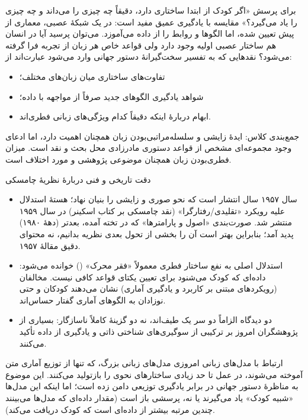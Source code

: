برای پرسش «اگر کودک از ابتدا ساختاری دارد، دقیقاً چه چیزی را می‌داند و چه چیزی را یاد می‌گیرد؟» مقایسه با یادگیری عمیق مفید است: در یک شبکهٔ عصبی، معماری از پیش تعیین شده، اما الگوها و روابط را از داده می‌آموزد. می‌توان پرسید آیا در انسان هم ساختار عصبی اولیه وجود دارد ولی قواعد خاص هر زبان از تجربه فرا گرفته می‌شود؟ نقدهایی که به تفسیر سخت‌گیرانهٔ دستور جهانی وارد می‌شود عبارت‌اند از:
\begin{itemize}
  \item تفاوت‌های ساختاری میان زبان‌های مختلف؛
  \item شواهد یادگیری الگوهای جدید صرفاً از مواجهه با داده؛
  \item ابهام دربارهٔ اینکه دقیقاً کدام ویژگی‌های زبانی فطری‌اند.
\end{itemize}

جمع‌بندی کلاس: ایدهٔ زایشی و سلسله‌مراتبی‌بودن زبان همچنان اهمیت دارد، اما ادعای وجود مجموعه‌ای مشخص از قواعد دستوری مادرزادی محل بحث و نقد است. میزان فطری‌بودن زبان همچنان موضوعی پژوهشی و مورد اختلاف است.

\begin{correctionbox}{دقت تاریخی و فنی دربارهٔ نظریهٔ چامسکی}
\begin{itemize}
  \item سال ۱۹۵۷ سال انتشار  است که نحو صوری و زایشی را بنیان نهاد؛ هستهٔ استدلال علیه رویکرد «تقلیدی/رفتارگرا» (نقد چامسکی بر کتاب  اسکینر) در سال ۱۹۵۹ منتشر شد. صورت‌بندی «اصول و پارامترها» که در تخته آمده، بعدتر (دههٔ ۱۹۸۰) پدید آمد؛ بنابراین بهتر است آن را بخشی از تحول بعدی نظریه بدانیم، نه محتوای دقیق مقالهٔ ۱۹۵۷.
  \item استدلال اصلی به نفع ساختار فطری معمولاً «فقر محرک» () خوانده می‌شود: داده‌ای که کودک می‌شنود برای تعیین یکتای قواعد کافی نیست. مخالفان (رویکردهای مبتنی بر کاربرد و یادگیری آماری) نشان می‌دهند کودکان و حتی نوزادان به الگوهای آماری گفتار حساس‌اند.
  \item دو دیدگاه الزاماً دو سر یک طیف‌اند، نه دو گزینهٔ کاملاً ناسازگار: بسیاری از پژوهشگران امروز بر ترکیبی از سوگیری‌های شناختی ذاتی و یادگیری از داده تأکید می‌کنند.
\end{itemize}
\end{correctionbox}

\begin{addedbox}{ارتباط با مدل‌های زبانی امروزی}
مدل‌های زبانی بزرگ، که تنها از توزیع آماری متن آموخته می‌شوند، در عمل تا حد زیادی ساختارهای نحوی را بازتولید می‌کنند. این موضوع به مناظرهٔ دستور جهانی در برابر یادگیری توزیعی دامن زده است؛ اما اینکه این مدل‌ها «شبیه کودک» یاد می‌گیرند یا نه، پرسشی باز است (مقدار داده‌ای که مدل‌ها می‌بینند چندین مرتبه بیشتر از داده‌ای است که کودک دریافت می‌کند).
\end{addedbox}

